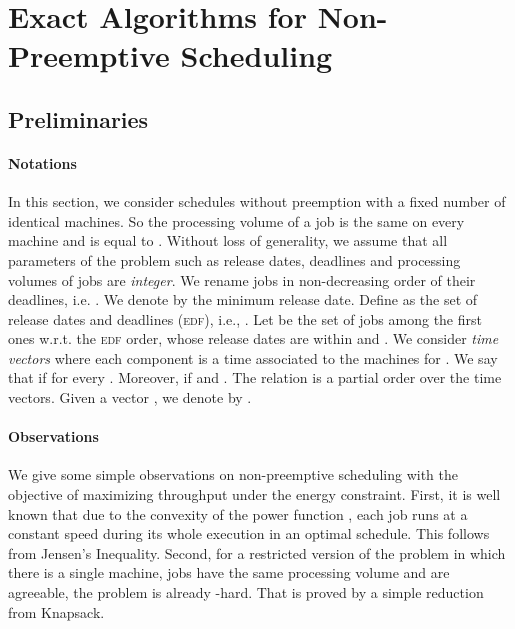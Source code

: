 \documentclass[11pt,a4paper]{article}
\begin{document}
\section{Exact Algorithms for Non-Pre\-emptive Scheduling}	\label{sec:exact}

\subsection{Preliminaries}

\paragraph{Notations} In this section, we consider schedules without preemption with 
a fixed number  of identical machines. So the processing volume of a job 
is the same on every machine and is equal to . 
Without loss of generality, we assume that all parameters of the problem such as 
release dates, deadlines and processing volumes of jobs are \emph{integer}.
We rename jobs in non-decreasing order of their deadlines, i.e. 
.
We denote by  
the minimum release date.
Define  as the set of release dates and deadlines (\textsc{edf}), 
i.e., .
Let  
be the set of jobs among the  first ones w.r.t. the \textsc{edf} order,
whose release dates are within  and .
We consider \emph{time vectors}  
where each component  is a time associated to the machines  for .
We say that  if  for every .
Moreover,  if  and 
. The relation  is a partial order over 
the time vectors. Given a vector , we denote by 
.

\paragraph{Observations} We give some simple observations on non-preemptive scheduling with the objective 
of maximizing
throughput under the energy constraint. First, it is well known that
due to the convexity of the power function , 
each job runs at a constant speed during its whole
execution in an optimal schedule. This follows from Jensen's Inequality.
Second, for a restricted version of the problem in which there is a single machine, jobs have the same 
processing volume and are agreeable, the problem is already -hard.
That is proved by a simple reduction from {\sc Knapsack}.
\end{document}
